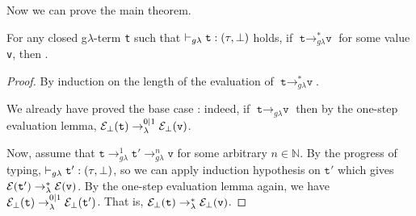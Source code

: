 Now we can prove the main theorem.
\begin{theorem}
	For any closed g$\lambda$-term \texttt{t} such that
	$\vdash_{g\lambda} \texttt{t} : (\tau, \bot)$ holds, 
	if	$\texttt{t} \rightarrow^{\ast}_{g\lambda} \texttt{v}$ for some value \texttt{v}, then
	 . 
\end{theorem}
\begin{proof} By induction on the length of the evaluation of 
$\texttt{t} \rightarrow^{\ast}_{g\lambda} \texttt{v}$. 


We already have proved the base case : indeed, if $\texttt{t} \rightarrow_{g\lambda} \texttt{v}$ then by the one-step evaluation lemma, 
$\mathcal{E}_{\bot}(\texttt{t}) \rightarrow^{0 | 1}_{\lambda} 
\mathcal{E}_{\bot}(\texttt{v})$. 

Now, assume that $\texttt{t} \rightarrow^{1}_{g\lambda} 
\texttt{t}' \rightarrow^{n}_{g\lambda}  \texttt{v}$
for some arbitrary $n \in \mathbb{N}$.
By the progress of typing, 
$ \vdash_{g\lambda} \texttt{t}' : (\tau, \bot) $, so we can apply induction hypothesis on $\texttt{t}'$ which gives~
$\mathcal{E}(\texttt{t}') \rightarrow^\ast_{\lambda} \mathcal{E}(\texttt{v})$.
By the one-step evaluation lemma again, we have 
$\mathcal{E}_{\bot}(\texttt{t}) \rightarrow^{0 | 1}_{\lambda} 
\mathcal{E}_{\bot}(\texttt{t}')$. 
That is, 
$\mathcal{E}_{\bot}(\texttt{t}) \rightarrow^{\ast}_{\lambda} 
\mathcal{E}_{\bot}(\texttt{v})$.
\end{proof}





